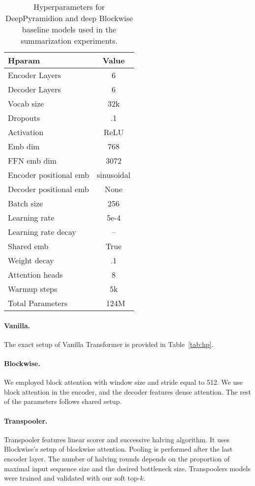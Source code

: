\documentclass{article}
\begin{document}
{\begin{table}
\caption{Hyperparameters for DeepPyramidion and deep Blockwise baseline models used in the summarization experiments.}
\label{tab:hp_deep}
\centering
\begin{tabular}{lc}
    \toprule
    Hparam & Value \\
    \midrule
    Encoder Layers & 6 \\
    Decoder Layers & 6 \\
    Vocab size & 32k \\
    Dropouts  & .1    \\
    Activation & ReLU \\
    Emb dim & 768 \\
    FFN emb dim & 3072  \\
    Encoder positional emb & sinusoidal \\
    Decoder positional emb & None \\
    Batch size          & 256 \\
    Learning rate       & 5e-4 \\
    Learning rate decay & -- \\
    Shared emb & True \\
    Weight decay        & .1 \\
    Attention heads & 8 \\
    Warmup steps & 5k \\
    Total Parameters & ~124M \\
    \bottomrule
\end{tabular}
\end{table}


\paragraph{Vanilla.}
The exact setup of Vanilla Transformer is provided in Table~\ref{tab:hp}.

\paragraph{Blockwise.}
We employed block attention with window size and stride equal to 512. We use block attention in the encoder, and the decoder features dense attention.
The rest of the parameters follows shared setup.

\paragraph{Transpooler.}
Transpooler features linear scorer and successive halving algorithm. It uses Blockwise's setup of blockwise attention. Pooling is performed after the last encoder layer.
The number of halving rounds depends on the proportion of maximal input sequence size and the desired bottleneck size.
Transpoolers models were trained and validated with our soft top-$k$.

}
\end{document}
